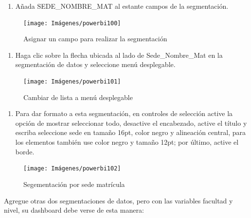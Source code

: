 \documentclass[
]{book}
\providecommand{\tightlist}{%
  \setlength{\itemsep}{0pt}\setlength{\parskip}{0pt}}
\begin{document}
\begin{enumerate}
\def\labelenumi{\arabic{enumi}.}
\setcounter{enumi}{1}
\tightlist
\item
  Añada SEDE\_NOMBRE\_MAT al estante campos de la segmentación.
\end{enumerate}

\begin{figure}

{\centering \texttt{[image: Imágenes/powerbi100]} 

}

\caption{Asignar un campo para realizar la segmentación}\label{fig:paso2segmentacion-fig}
\end{figure}

\begin{enumerate}
\def\labelenumi{\arabic{enumi}.}
\setcounter{enumi}{2}
\tightlist
\item
  Haga clic sobre la flecha ubicada al lado de Sede\_Nombre\_Mat en la segmentación de datos y seleccione menú desplegable.
\end{enumerate}

\begin{figure}

{\centering \texttt{[image: Imágenes/powerbi101]} 

}

\caption{Cambiar de lista a menú desplegable}\label{fig:paso3segmentacion-fig}
\end{figure}

\begin{enumerate}
\def\labelenumi{\arabic{enumi}.}
\setcounter{enumi}{3}
\tightlist
\item
  Para dar formato a esta segmentación, en controles de selección active la opción de mostrar seleccionar todo, desactive el encabezado, active el título y escriba seleccione sede en tamaño 16pt, color negro y alineación central, para los elementos también use color negro y tamaño 12pt; por último, active el borde.
\end{enumerate}

\begin{figure}

{\centering \texttt{[image: Imágenes/powerbi102]} 

}

\caption{Segementación por sede matrícula}\label{fig:paso4segmentacion-fig}
\end{figure}

Agregue otras dos segmentaciones de datos, pero con las variables facultad y nivel, su dashboard debe verse de esta manera:
\end{document}
